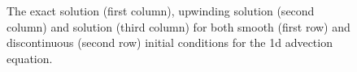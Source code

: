 \begin{figure}[!tbh]
     \caption{The exact solution (first column), upwinding solution (second column) and \protect{\lw} solution (third column) for both smooth (first row) and discontinuous (second row) initial conditions for the 1d advection equation.}
   \label{fig:sol}
\end{figure} 
   

